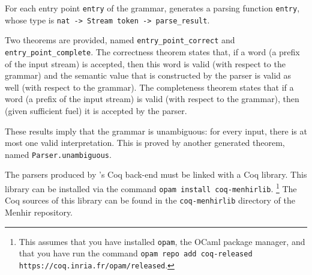 \documentclass[onecolumn,11pt,nocopyrightspace,preprint]{sigplanconf}
\begin{document}
For each entry point \verb+entry+ of the grammar, \menhir generates a
parsing function \verb+entry+, whose type is
\verb+nat -> Stream token -> parse_result+.


Two theorems are provided, named \verb+entry_point_correct+ and
\verb+entry_point_complete+. The correctness theorem states that, if a word (a
prefix of the input stream) is accepted, then this word is valid (with respect
to the grammar) and the semantic value that is constructed by the parser is
valid as well (with respect to the grammar). The completeness theorem states
that if a word (a prefix of the input stream) is valid (with respect to the
grammar), then (given sufficient fuel) it is accepted by the parser.

These results imply that the grammar is unambiguous: for every input, there is
at most one valid interpretation. This is proved by another generated theorem,
named \verb+Parser.unambiguous+.






The parsers produced by \menhir's Coq back-end must be linked with a Coq
library. This library can be installed via the command \verb+opam install coq-menhirlib+.%
%
\footnote{This assumes that you have installed \texttt{opam}, the OCaml package manager,
and that you have run the command \texttt{opam repo add coq-released
https://coq.inria.fr/opam/released}.}
%
The Coq sources of this library can be found in
the \texttt{coq-menhirlib} directory of the Menhir repository.
\end{document}

